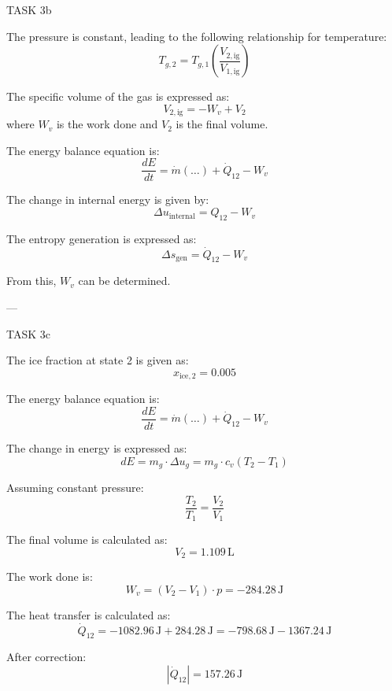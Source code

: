 TASK 3b  

The pressure is constant, leading to the following relationship for temperature:  
\[
T_{g,2} = T_{g,1} \left( \frac{V_{2,\text{ig}}}{V_{1,\text{ig}}} \right)
\]  

The specific volume of the gas is expressed as:  
\[
V_{2,\text{ig}} = -W_v + V_2
\]  
where \( W_v \) is the work done and \( V_2 \) is the final volume.  

The energy balance equation is:  
\[
\frac{dE}{dt} = \dot{m} (\ldots) + \dot{Q}_{12} - W_v
\]  

The change in internal energy is given by:  
\[
\Delta u_{\text{internal}} = Q_{12} - W_v
\]  

The entropy generation is expressed as:  
\[
\Delta s_{\text{gen}} = \dot{Q}_{12} - W_v
\]  

From this, \( W_v \) can be determined.  

---

TASK 3c  

The ice fraction at state 2 is given as:  
\[
x_{\text{ice},2} = 0.005
\]  

The energy balance equation is:  
\[
\frac{dE}{dt} = \dot{m} (\ldots) + \dot{Q}_{12} - W_v
\]  

The change in energy is expressed as:  
\[
dE = m_g \cdot \Delta u_g = m_g \cdot c_v (T_2 - T_1)
\]  

Assuming constant pressure:  
\[
\frac{T_2}{T_1} = \frac{V_2}{V_1}
\]  

The final volume is calculated as:  
\[
V_2 = 1.109 \, \text{L}
\]  

The work done is:  
\[
W_v = (V_2 - V_1) \cdot p = -284.28 \, \text{J}
\]  

The heat transfer is calculated as:  
\[
\dot{Q}_{12} = -1082.96 \, \text{J} + 284.28 \, \text{J} = -798.68 \, \text{J} - 1367.24 \, \text{J}
\]  

After correction:  
\[
|\dot{Q}_{12}| = 157.26 \, \text{J}
\]  
